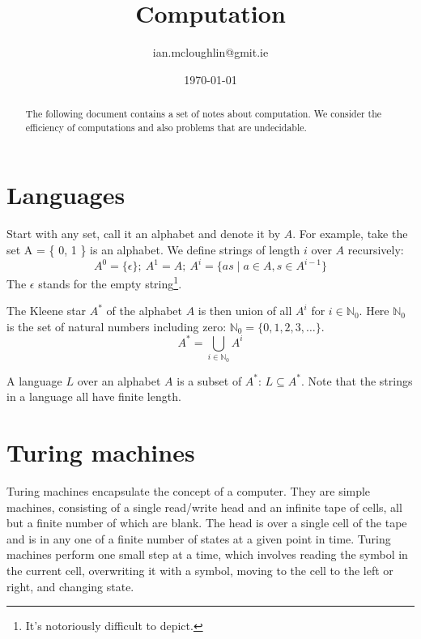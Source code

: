 

\title{Computation}
\author{ian.mcloughlin@gmit.ie}
\date{\today}

\newcommand{\CC}[1]{\textbf{#1}}



\maketitle

\begin{abstract}
  The following document contains a set of notes about computation.
  We consider the efficiency of computations and also problems that are undecidable.
\end{abstract}

\section{Languages}
Start with any set, call it an alphabet and denote it by \( A \).
  For example, take the set A = \{ 0, 1 \} is an alphabet.
  We define strings of length \( i \) over \( A \) recursively:
  \[
    A^0 = \{ \epsilon \}; \ 
    A^1 = A; \ 
    A^{i} = \{ as \mid a \in A, s \in A^{i-1} \}
  \]
  The \( \epsilon \) stands for the empty string\footnote{It's notoriously difficult to depict.}.

  The Kleene star \( A^* \) of the alphabet \( A \) is then union of all \( A^i \) for \( i \in \mathbb{N}_0 \).
  Here \( \mathbb{N}_0 \) is the set of natural numbers including zero: \( \mathbb{N}_0 = \{ 0, 1, 2, 3, \ldots \} \).
  \[ A^* = \bigcup_{i \in \mathbb{N}_0} A^i\]

  A language \( L \) over an alphabet \( A \) is a subset of \( A^* \): \( L \subseteq A^* \).
  Note that the strings in a language all have finite length.

\section{Turing machines}
  Turing machines encapsulate the concept of a computer.
  They are simple machines, consisting of a single read/write head and an infinite tape of cells, all but a finite number of which are blank.  
  The head is over a single cell of the tape and is in any one of a finite number of states at a given point in time.
  Turing machines perform one small step at a time, which involves reading the symbol in the current cell, overwriting it with a symbol, moving to the cell to the left or right, and changing state.

